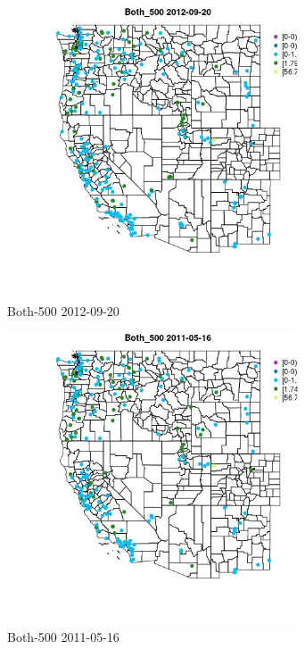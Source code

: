 \begin{figure} 
\centering  
\includegraphics[width=0.77\textwidth]{Code_Outputs/ML_input_report_ML_input_PM25_Step5_part_d_de_duplicated_aves_ML_input_MapObsBoth_5002012-09-20.jpg} 
\caption{\label{fig:ML_input_report_ML_input_PM25_Step5_part_d_de_duplicated_aves_ML_inputMapObsBoth_5002012-09-20}Both-500 2012-09-20} 
\end{figure} 
 

\begin{figure} 
\centering  
\includegraphics[width=0.77\textwidth]{Code_Outputs/ML_input_report_ML_input_PM25_Step5_part_d_de_duplicated_aves_ML_input_MapObsBoth_5002011-05-16.jpg} 
\caption{\label{fig:ML_input_report_ML_input_PM25_Step5_part_d_de_duplicated_aves_ML_inputMapObsBoth_5002011-05-16}Both-500 2011-05-16} 
\end{figure} 
 


